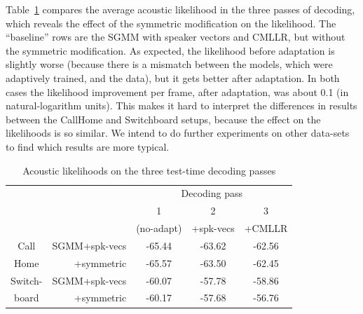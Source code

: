 \documentclass{article}
\begin{document}


Table~\ref{tab:likes} compares
the average acoustic likelihood in the three passes of decoding, which reveals the effect of the
symmetric modification on the likelihood.  The ``baseline'' rows are the SGMM with speaker vectors 
and CMLLR, but without the symmetric modification.  As expected, the likelihood before adaptation
is slightly worse (because there is a mismatch between the models, which were adaptively trained,
and the data), but it gets better after adaptation.  In both cases the likelihood improvement per
frame, after adaptation, was about 0.1 (in natural-logarithm units).  This makes it 
hard to interpret the differences in results between the CallHome and Switchboard setups, because
the effect on the likelihoods is so similar.  We intend to do further experiments on other
data-sets to find which results are more typical.


\begin{table}[h]
 \renewcommand\arraycolsep{-0.1in}
  \begin{tabular}{|cr|ccc|}           \hline 
           &              &   \multicolumn{3}{c|}{ Decoding pass }           \\
           &              &   1         &     2       &          3            \\  
           &              & {\footnotesize (no-adapt)}  &{\footnotesize  +spk-vecs}  & {\footnotesize +CMLLR}         \\  \hline
  Call     &{\footnotesize SGMM+spk-vecs}&  -65.44     &   -63.62    &  -62.56              \\ 
  Home     & {\footnotesize +symmetric}    &  -65.57     &   -63.50    &  -62.45            \\ \hline
  Switch-  & {\footnotesize SGMM+spk-vecs}&  -60.07     &  -57.78     &  -58.86             \\
  board    & {\footnotesize +symmetric}    &  -60.17     &  -57.68     &  -56.76            \\ \hline
  \end{tabular}
   \caption{Acoustic likelihoods on the three test-time decoding passes}
 \label{tab:likes}
\end{table}
\end{document}
